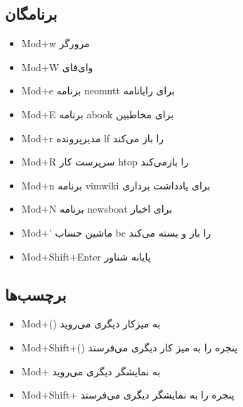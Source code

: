 \documentclass{article}
\newcommand{\s}[1]{\textenglish{Mod+#1}}
\begin{document}
\subsection{برنامگان}
\begin{itemize}
	\item \s{w} مرورگر
	\item \s{W} وای‌فای
	\item \s{e} برنامه neomutt برای رایانامه
	\item \s{E} برنامه abook برای مخاطبین
	\item \s{r} مدیرپرونده lf را باز می‌کند
	\item \s{R} سرپرست کار htop را بازمی‌کند
	\item \s{n} برنامه vimwiki برای یادداشت برداری
	\item \s{N} برنامه newsboat برای اخبار
	\item \s{'} ماشین حساب bc را باز و بسته می‌کند
	\item \s{Shift+Enter} پایانه شناور
\end{itemize}
\subsection{برچسب‌ها}
\begin{itemize}
	\item \s{()} به میزکار دیگری می‌روید
	\item \s{Shift+()} پنجره را به میز کار دیگری می‌فرستد
	\item \s{} به نمایشگر دیگری می‌روید
	\item \s{Shift+} پنجره را به نمایشگر دیگری می‌فرستد
\end{itemize}
\end{document}
